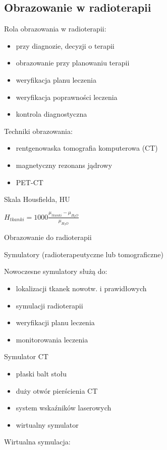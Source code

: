 \documentclass{article}
\begin{document}
\subsection{Obrazowanie w radioterapii}

Rola obrazowania w radioterapii:
\begin{itemize}
    \item przy diagnozie, decyzji o terapii
    \item obrazowanie przy planowaniu terapii
    \item weryfikacja planu leczenia
    \item weryfikacja poprawności leczenia
    \item kontrola diagnostyczna
\end{itemize}

Techniki obrazowania:
\begin{itemize}
    \item rentgenowaska tomografia komputerowa (CT)
    \item magnetyczny rezonans jądrowy
    \item PET-CT
\end{itemize}

Skala Housfielda, HU

$H_{tkanki} = 1000 \frac{\mu_{tkanki}-\mu_{H_2O}}{\mu_{H_2O}}$

Obrazowanie do radioterapii

Symulatory (radioterapeutyczne lub tomograficzne)

Nowoczesne symulatory służą do:
\begin{itemize}
    \item lokalizacji tkanek nowotw. i prawidłowych
    \item symulacji radioterapii
    \item weryfikacji planu leczenia
    \item monitorowania leczenia
\end{itemize}

Symulator CT
\begin{itemize}
    \item płaski balt stołu
    \item duży otwór pierścienia CT
    \item system wskaźników laserowych
    \item wirtualny symulator
\end{itemize}

Wirtualna symulacja:
\end{document}
